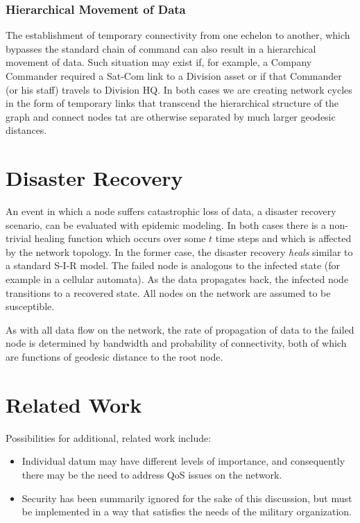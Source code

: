 \documentclass[10pt]{./IEEEtran}
\begin{document}
\subsubsection{Hierarchical Movement of Data}
The establishment of temporary connectivity from one echelon to another, which bypasses the standard chain of command can also result in a hierarchical movement of data.  Such situation may exist if, for example, a Company Commander required a Sat-Com link to a Division asset or if that Commander (or his staff) travels to Division HQ.  In both cases we are creating network cycles in the form of temporary links that transcend the hierarchical structure of the graph and connect nodes tat are otherwise separated by much larger geodesic distances.


\section{Disaster Recovery}
An event in which a node suffers catastrophic loss of data, a disaster recovery scenario, can be evaluated with epidemic modeling.  In both cases there is a non-trivial healing function which occurs over some $t$ time steps and which is affected by the network topology\cite{Ganesh:2005}.  In the former case, the disaster recovery \emph{heals} similar to a standard S-I-R model.  The failed node is analogous to the infected state (for example in a cellular automata).  As the data propagates back, the infected node transitions to a recovered state.  All nodes on the network are assumed to be susceptible.  

As with all data flow on the network, the rate of propagation of data to the failed node is determined by bandwidth and probability of connectivity, both of which are functions of geodesic distance to the root node.


\section{Related Work}
Possibilities for additional, related work include:
\begin{itemize}
	\item Individual datum may have different levels of importance, and consequently there may be the need to address QoS issues on the network.
	\item Security has been summarily ignored for the sake of this discussion, but must be implemented in a way that satisfies the needs of the military organization.
\end{itemize}
\end{document}
